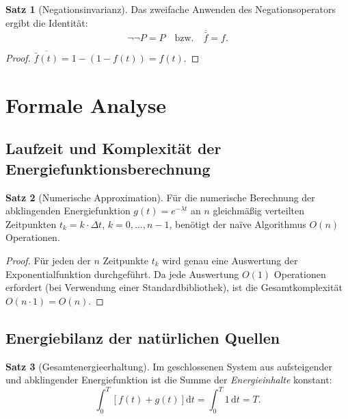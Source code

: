 ﻿\documentclass[a4paper,12pt]{article}
\theoremstyle{definition}
\newtheorem{satz}{Satz}
\begin{document}
\begin{satz}[Negationsinvarianz]
\label{satz:invarianz}
    Das zweifache Anwenden des Negationsoperators ergibt die Identit\"at:
    \[
        \neg\neg P = P \quad \text{bzw.} \quad \overline{\bar{f}} = f.
    \]
\end{satz}

\begin{proof}
    $\overline{\bar{f}(t)} = 1 - (1 - f(t)) = f(t)$. \qedhere
\end{proof}

\section{Formale Analyse}
\label{sec:analyse}

\subsection{Laufzeit und Komplexit\"at der Energiefunktionsberechnung}

\begin{satz}[Numerische Approximation]
    F\"ur die numerische Berechnung der abklingenden Energiefunktion
    $g(t) = e^{-\lambda t}$ an $n$ gleichm\"a\ss{}ig verteilten Zeitpunkten
    $t_k = k \cdot \Delta t$, $k = 0,\ldots,n-1$, ben\"otigt der na\"ive
    Algorithmus $O(n)$ Operationen.
\end{satz}

\begin{proof}
    F\"ur jeden der $n$ Zeitpunkte $t_k$ wird genau eine Auswertung der Exponentialfunktion
    durchgef\"uhrt. Da jede Auswertung $O(1)$ Operationen erfordert (bei Verwendung
    einer Standardbibliothek), ist die Gesamtkomplexit\"at $O(n \cdot 1) = O(n)$. \qedhere
\end{proof}

\subsection{Energiebilanz der nat\"urlichen Quellen}

\begin{satz}[Gesamtenergieerhaltung]
\label{satz:energie}
    Im geschlossenen System aus aufsteigender und abklingender Energiefunktion
    ist die Summe der \emph{Energieinhalte} konstant:
    \[
        \int_0^T \left[f(t) + g(t)\right] \mathrm{d}t = \int_0^T 1\,\mathrm{d}t = T.
    \]
\end{satz}
\end{document}
